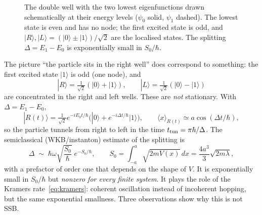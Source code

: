\documentclass[11pt,a4paper]{article}
\theoremstyle{definition}
\theoremstyle{remark}
\newcommand{\hb}{\hbar}
\newcommand{\ket}[1]{|#1\rangle}
\newcommand{\ev}[1]{\langle #1\rangle}
\begin{document}
\begin{figure}[t]
\centering
{}
\caption{The double well with the two lowest eigenfunctions drawn schematically at their energy levels
($\psi_0$ solid, $\psi_1$ dashed). The lowest state is even and has no node; the first excited state is odd, and
$\ket{R},\ket{L}=(\ket0\pm\ket1)/\sqrt2$ are the localised states. The splitting $\Delta=E_1-E_0$ is
exponentially small in $S_0/\hb$.}
\label{fig:well}
\end{figure}

The picture ``the particle sits in the right well'' does correspond to something: the first excited state
$\ket1$ is odd (one node), and
\begin{equation}
\ket R=\tfrac1{\sqrt2}(\ket0+\ket1),\qquad \ket L=\tfrac1{\sqrt2}(\ket0-\ket1)
\end{equation}
are concentrated in the right and left wells. These are \emph{not} stationary. With $\Delta=E_1-E_0$,
\begin{equation}
\ket{R(t)}=\tfrac1{\sqrt2}e^{-iE_0t/\hb}\bigl(\ket0+e^{-i\Delta t/\hb}\ket1\bigr),
\qquad \ev{x}_{R(t)}\simeq a\cos(\Delta t/\hb),
\end{equation}
so the particle tunnels from right to left in the time $t_{\rm tun}=\pi\hb/\Delta$. The semiclassical
(WKB/instanton) estimate of the splitting is
\begin{equation}
\Delta\;\sim\;\hb\omega\sqrt{\frac{S_0}{\hb}}\;e^{-S_0/\hb},\qquad
S_0=\int_{-a}^{a}\!\sqrt{2mV(x)}\,dx=\frac{4a^3}{3}\sqrt{2m\lambda},
\label{eq:split}
\end{equation}
with a prefactor of order one that depends on the shape of $V$. It is exponentially small in $S_0/\hb$ but
\emph{nonzero for every finite system}. It plays the role of the Kramers rate~\eqref{eq:kramers}: coherent
oscillation instead of incoherent hopping, but the same exponential smallness. Three observations show why this
is not SSB.
\end{document}
